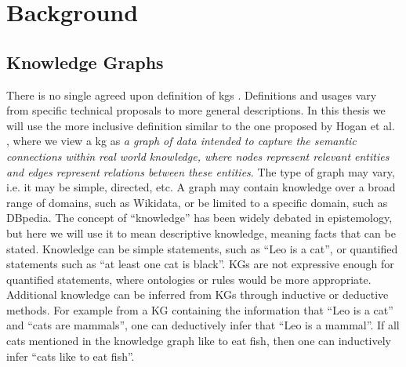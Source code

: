 \chapter{Background}


\section{Knowledge Graphs}
There is no single agreed upon definition of \glspl{kg} \cite{bergman_2019, bonatti2019knowledge, ehrlinger2016towards}. Definitions and usages vary from specific technical proposals to more general descriptions. In this thesis we will use the more inclusive definition similar to the one proposed by Hogan et al. \cite{hogan2020knowledge}, where we view a \gls{kg} as \textit{a graph of data intended to capture the semantic connections within real world knowledge, where nodes represent relevant entities and edges represent relations between these entities}. The type of graph may vary, i.e. it may be simple, directed, etc. A graph may contain knowledge over a broad range of domains, such as Wikidata\cite{lehmann2015dbpedia}, or be limited to a specific domain, such as DBpedia\cite{fellbaum2010wordnet}. The concept of ``knowledge'' has been widely debated in epistemology, but here we will use it to mean descriptive knowledge, meaning facts that can be stated. Knowledge can be simple statements, such as ``Leo is a cat'', or quantified statements such as ``at least one cat is black''. KGs are not expressive enough for quantified statements, where ontologies or rules would be more appropriate. Additional knowledge can be inferred from KGs through inductive or deductive methods. For example from a KG containing the information that ``Leo is a cat'' and ``cats are mammals'', one can deductively infer that ``Leo is a mammal''. If all cats mentioned in the knowledge graph like to eat fish, then one can inductively infer ``cats like to eat fish''.



